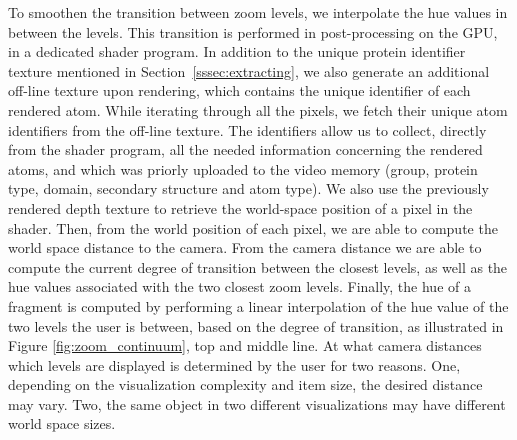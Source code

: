 \documentclass{egpubl}
\begin{document}
	
	To smoothen the transition between zoom levels, we interpolate the hue values in between the levels.	
	This transition is performed in post-processing on the GPU, in a dedicated shader program.
	In addition to the unique protein identifier texture mentioned in Section~\ref{sssec:extracting}, we also generate an additional off-line texture upon rendering, which contains the unique identifier of each rendered atom.
	While iterating through all the pixels, we fetch their unique atom identifiers from the off-line texture.
	The identifiers allow us to collect, directly from the shader program, all the needed information concerning the rendered atoms, and which was priorly uploaded to the video memory (group, protein type, domain, secondary structure and atom type).	
	We also use the previously rendered depth texture to retrieve the world-space position of a pixel in the shader.
	Then, from the world position of each pixel, we are able to compute the world space distance to the camera.
	From the camera distance we are able to compute the current degree of transition between the closest levels, as well as the hue values associated with the two closest zoom levels.	
	Finally, the hue of a fragment is computed by performing a linear interpolation of the hue value of the two levels the user is between, based on the degree of transition, as illustrated in Figure \ref{fig:zoom_continuum}, top and middle line.
	At what camera distances which levels are displayed is determined by the user for two reasons.
	One, depending on the visualization complexity and item size, the desired distance may vary.
	Two, the same object in two different visualizations may have different world space sizes.
	
\end{document}
